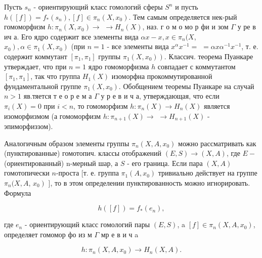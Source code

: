 \documentclass[10pt]{article}
\begin{document}
Пусть $s_{n}$ - ориентирующий класс гомологий сферы $S^{n}$ и пусть $h([f])=f_{*}\left(s_{n}\right),[f] \in \pi_{n}\left(X, x_{0}\right)$. Тем самым определяется нек-рый гомоморфизм $h: \pi_{n}\left(X, x_{0}\right) \rightarrow$ $\rightarrow H_{n}(X)$, наз. г о м о мо р фи и зом $\Gamma$ у ре в ич а. Его ядро содержит все элементы вида $\alpha x-x, x \in \pi_{n}(X$, $\left.x_{0}\right), \alpha \in \pi_{1}\left(X, x_{0}\right)$ (при $n=1$ - все элементы вида $x^{\alpha} x^{-1}=$ $=\alpha x \alpha^{-1} x^{-1}$, т. е. содержит коммутант $\left[\pi_{1}, \pi_{1}\right]$ группы $\left.\pi_{1}\left(X, x_{0}\right)\right)$. Классич. теорема Пуанкаре утверждает, что при $n=1$ ядро гомоморфизма $h$ совпадает с коммутантом $\left[\pi_{1}, \pi_{1}\right]$, так что группа $H_{1}(X)$ изоморфна прокоммутированной фундаментальной группе $\pi_{1}\left(X, x_{0}\right)$. Обобщением теоремы Пуанкаре на случай $n>1$ яв.тяется т е о р е м а $\Gamma$ у р е в и ч а, утверждающая, что если $\pi_{i}(X)=0$ при $i<n$, то гомоморфизм $h: \pi_{n}(X) \rightarrow H_{n}(X)$ является изоморфизмом (а гомоморфизм $h: \pi_{n+1}(X) \rightarrow$ $\rightarrow H_{n+1}(X)$ - эпиморфиззом).



Аналогичным образом элементы группы $\pi_{n}\left(X, A, x_{0}\right)$ можно рассматривать как (пунктированные) гомотопич. классы отображений $(E, S) \rightarrow(X, A)$, где $E-$ (ориентированный) n-мерный шар, а $S$ - его граница. Если пара $(X, A)$ гомотопически $n$-проста [т. е. группа $\pi_{1}\left(A, x_{0}\right)$ тривиально действует на группе $\pi_{n}(X, A$, $\left.x_{0}\right)$ ], то в этом определении пунктированность можно игнорировать. Формула



\[

h([f])=f_{*}\left(e_{n}\right),

\]



где $e_{n}$ - ориентирующий класс гомологий пары $(E, S)$, a $[f] \in \pi_{n}\left(X, A, x_{0}\right)$, определяет гомомор фо из м $\Gamma$ мр е в и ч a



\[

h: \pi_{n}\left(X, A, x_{0}\right) \rightarrow H_{n}(X, A) .

\]
\end{document}
